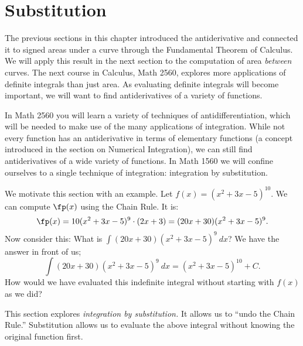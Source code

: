%



\section{Substitution}\label{sec:substitution1}

The previous sections in this chapter introduced the antiderivative and connected it to signed areas under a curve through the Fundamental Theorem of Calculus. We will apply this result in the next section to the computation of area \textit{between} curves. The next course in Calculus, Math 2560,  explores more applications of definite integrals than just area. As evaluating definite integrals will become important, we will want to find antiderivatives of a variety of functions.

In Math 2560 you will learn a variety of techniques of antidifferentiation, which will be needed to make use of the many applications of integration. While not every function has an antiderivative in terms of elementary functions (a concept introduced in the section on Numerical Integration), we can still find antiderivatives of a wide variety of functions. In Math 1560 we will confine ourselves to a single technique of integration: integration by substitution.


We motivate this section with an example. Let $f(x) = (x^2+3x-5)^{10}$. We can compute $\fp(x)$ using the Chain Rule. It is:
	$$\fp(x) = 10(x^2+3x-5)^9\cdot(2x+3) = (20x+30)(x^2+3x-5)^9.$$
Now consider this: What is $\int (20x+30)(x^2+3x-5)^9\ dx$? We have the answer in front of us; $$\int (20x+30)(x^2+3x-5)^9\ dx = (x^2+3x-5)^{10}+C.$$
How would we have evaluated this indefinite integral without starting with $f(x)$ as we did?

This section explores \textit{integration by substitution.} It allows us to ``undo the Chain Rule.'' Substitution allows us to evaluate the above integral without knowing the original function first.

